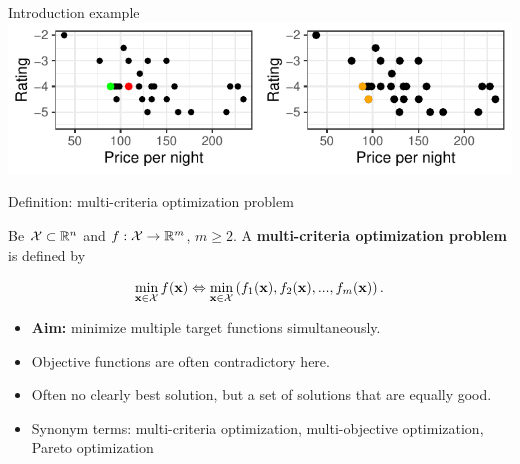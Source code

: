 \begin{frame}[allowframebreaks]{Introduction example}
\centering \includegraphics[width=\maxwidth]{images/expedia-2-1}

\end{frame}


\begin{frame}{Definition: multi-criteria optimization problem}

Be $\mathcal{X} \subset \mathbb{R}^n$ and $f: \mathcal{X} \to \mathbb{R}^m$, $m \ge 2$. A \textbf{multi-criteria optimization problem} is defined by

$$
\min_{\mathbf{x} \in \mathcal{X}}  f(\mathbf{x}) \Leftrightarrow \min_{\mathbf{x} \in \mathcal{X}} \left(f_1(\mathbf{x}), f_2(\mathbf{x}), ..., f_m(\mathbf{x})\right).
$$

\begin{itemize}
\item \textbf{Aim: } minimize multiple target functions simultaneously.
\item Objective functions are often contradictory here.
\item Often no clearly best solution, but a set of solutions that are equally good.
\item Synonym terms: multi-criteria optimization, multi-objective optimization, Pareto optimization
\end{itemize}

\end{frame}



